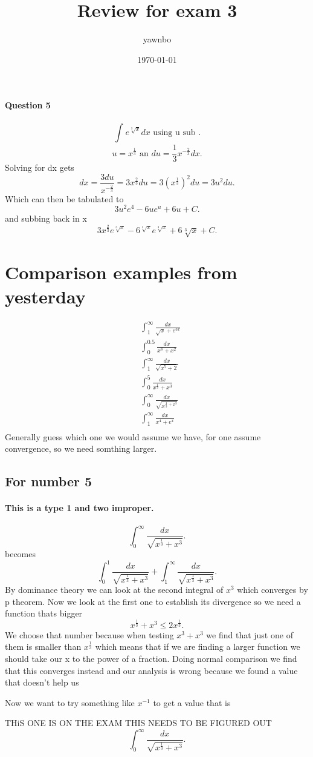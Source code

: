 \documentclass[a4paper]{article}
\title{Review for exam 3}
\author{yawnbo}
\date{\today}
\begin{document}
\paragraph{Question 5}
\[
\int_{}^{} e^{\sqrt[3]{x}}dx \text{ using u sub  }
.\] 
\[
u=x^{\frac{1}{3}} \text{ an } du=\frac{1}{3}x^{-\frac{2}{3}}dx
.\] 
Solving for dx gets 
\[
dx= \frac{3du}{x^{-\frac{2}{3}}}=3x^{\frac{2}{3}}du=3\left( x^{\frac{1}{3}} \right) ^2du=3u^2du
.\] 
Which can then be tabulated to
\[
3u^2e^{4}-6ue^{u}+6u+C
.\] 
and subbing back in x
\[
3x^{\frac{2}{3}}e^{\sqrt[3]{x}}-6^{\sqrt[3]{x}}e^{\sqrt[3]{x}}+6\sqrt[3]{x}+C
.\] 
\section{Comparison examples from yesterday}%
\label{sec:Comparison examples from yesterday}

\begin{align}
 &\int_{1}^{\infty} \frac{dx}{\sqrt{x}+e^{3x}} \\
 &\int_{0}^{0.5} \frac{dx}{x^{8}+x^2} \\
 &\int_{1}^{\infty} \frac{dx}{\sqrt{x^{5}+2}} \\
 &\int_{0}^{5} \frac{dx}{x^{\frac{1}{3}}+x^3} \\
 &\int_{0}^{\infty} \frac{dx}{\sqrt{x^{\frac{1}{3}+x^3}}} \\
 &\int_{1}^{\infty} \frac{dx}{x^{4}+e^{x}}\\
\end{align}
Generally guess which one we would assume we have, for one assume convergence, so we need somthing larger.
\newpage
\subsection{For number 5}%
\label{sub:For number 5}
\paragraph{This is a type 1 and two improper.}
\[
\int_{0}^{\infty} \frac{dx}{\sqrt{x^{\frac{1}{3}}+x^3}}
.\] 
becomes
\[
\int_{0}^{1} \frac{dx}{\sqrt{x^{\frac{1}{3}}+x^3}} + \int_{1}^{\infty} \frac{dx}{\sqrt{x^{\frac{1}{3}}+x^3}}
.\] 
By dominance theory we can look at the second integral of $x^3$ which converges by p theorem. 
Now we look at the first one to establish its divergence so we need a function thats bigger
\[
x^{\frac{1}{3}}+x^3 \le 2x^{\frac{1}{3}}
.\] 
We choose that number because when testing $x^3+x^3$ we find that just one of them is smaller than $x^{\frac{1}{3}}$ which means that if we are finding a larger function we should take our x to the power of a fraction.
Doing normal comparison we find that this converges instead and our analysis is wrong because we found a value that doesn't help us

Now we want to try something like $x^{-1}$ to get a value that is 

THiS ONE IS ON THE EXAM THIS NEEDS TO BE FIGURED OUT 
\[
\int_{0}^{\infty} \frac{dx}{\sqrt{x^{\frac{1}{3}}+x^3}}
.\] 
\end{document}
